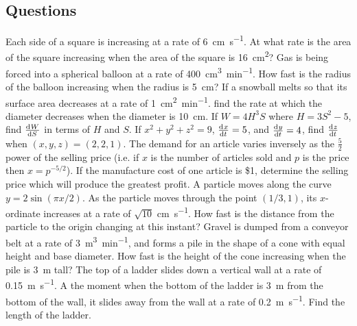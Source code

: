 \subsection*{Questions}
\begin{questions}
  \questioM Each side of a square is increasing at a rate of \SI{6}{\centi\metre\per\second}. At what rate is the
            area of the square increasing when the area of the square is \SI{16}{\centi\metre\squared}?
  \questioM Gas is being forced into a spherical balloon at a rate of \SI{400}{\centi\metre\cubed\per\minute}. How fast
            is the radius of the balloon increasing when the radius is \SI{5}{\centi\metre}?
  \questioM If a snowball melts so that its surface area decreases at a rate of \SI{1}{\centi\metre\squared\per\minute}.
            find the rate at which the diameter decreases when the diameter is \SI{10}{\centi\metre}.
  \questioM If $ W = 4H^3 S $ where $ H = 3S^2 - 5 $, find $ \od{W}{S} $ in terms of $ H $ and $ S $.
  \questioM If $ x^2 + y^2 + z^2 = 9 $, $ \od{x}{t} = 5 $, and $ \od{y}{t} = 4 $, find $ \od{z}{t} $ when $ (x,y,z) = (2,2,1) $.
  \questioE The demand for an article varies inversely as the $ \frac{5}{2} $ power of the selling price (i.e. if $ x $ is
            the number of articles sold and $ p $ is the price then $ x = p^{-5/2} $). If the manufacture cost of one
            article is \$1, determine the selling price which will produce the greatest profit.
  \questioE A particle moves along the curve $ y = 2\sin(\pi x/2) $. As the particle moves through the point $ (1/3, 1) $,
            its $ x$-ordinate increases at a rate of $ \sqrt{10} $ \si{\centi\metre\per\second}. How fast is the distance
            from the particle to the origin changing at this instant?
  \questioM Gravel is dumped from a conveyor belt at a rate of \SI{3}{\metre\cubed\per\minute}, and forms a pile in the shape
            of a cone with equal height and base diameter. How fast is the height of the cone increasing when the pile is \SI{3}{\metre}
            tall?
  \questioM The top of a ladder slides down a vertical wall at a rate of \SI{0.15}{\metre\per\second}. A the moment when the bottom
            of the ladder is \SI{3}{\metre} from the bottom of the wall, it slides away from the wall at a rate of \SI{0.2}{\metre\per\second}.
            Find the length of the ladder.

\end{questions}

